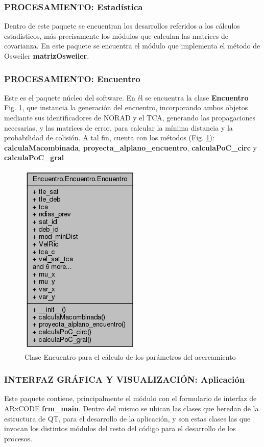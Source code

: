 \subsubsection*{PROCESAMIENTO: Estad\'istica}
Dentro de este paquete se encuentran los desarrollos referidos a los c\'alculos estad\'isticos, m\'as precisamente los m\'odulos que calculan las matrices de covarianza. En este paquete se encuentra el m\'odulo que implementa el m\'etodo de Osweiler {\bf{matrizOsweiler}}.

\subsubsection*{PROCESAMIENTO: Encuentro}
Este es el paquete n\'ucleo del software. En \'el se encuentra la clase {\bf{Encuentro}}  Fig. \ref{fig:claseencuentro}, que instancia la generaci\'on del encuentro, incorporando ambos objetos mediante sus identificadores de NORAD y el TCA, generando las propagaciones necesarias, y las matrices de error, para calcular la m\'inima distancia y la probabilidad de colisi\'on. A tal fin, cuenta con los m\'etodos (Fig. \ref{fig:claseencuentro}): {\bf{calculaMacombinada}}, {\bf{proyecta\_alplano\_encuentro}}, {\bf{calculaPoC\_circ}} y  {\bf{calculaPoC\_gral}}\\

\begin{figure}[h!]
  \centering
  \includegraphics[width=.3\textwidth]{imagenes/encuentroClass} 
  \caption[Clase Encuentro]{Clase Encuentro para el c\'alculo de los par\'ametros del acercamiento}
  \label{fig:claseencuentro}
\end{figure}


\subsubsection*{INTERFAZ GR\'AFICA Y VISUALIZACI\'ON: Aplicaci\'on}
Este paquete contiene, principalmente el m\'odulo con el formulario de interfaz de ARxCODE {\bf{frm\_main}}. Dentro del mismo se ubican las clases que heredan de la estructura de QT, para el desarrollo de la aplicaci\'on, y son estas clases las que invocan los distintos m\'odulos del resto del c\'odigo para el desarrollo de los procesos.\\

